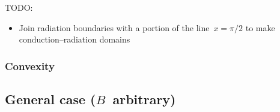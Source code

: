 TODO:
\begin{itemize}
  \item Join radiation boundaries with a portion of the line~$x = \pi/2$
        to make conduction--radiation domains
\end{itemize}

\subsubsection{Convexity}
\label{sec:cartesian.cosine.simple.convexity}

\subsection{General case (\texorpdfstring{$B$~arbitrary}{B arbitrary})}
\label{sec:cartesian.cosine.general}
